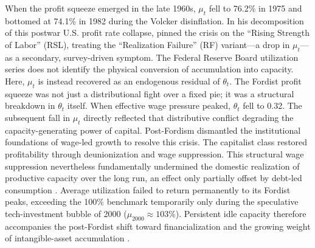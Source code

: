 When the profit squeeze emerged in the late 1960s, $\mu_t$ fell to 76.2\% in 1975 and bottomed at 74.1\% in 1982 during the Volcker disinflation. In his decomposition of this postwar U.S. profit rate collapse, \citet{Weisskopf1979} pinned the crisis on the ``Rising Strength of Labor'' (RSL), treating the ``Realization Failure'' (RF) variant—a drop in $\mu_t$—as a secondary, survey-driven symptom. The Federal Reserve Board utilization series does not identify the physical conversion of accumulation into capacity. Here, $\mu_t$ is instead recovered as an endogenous residual of $\theta_t$. The Fordist profit squeeze was not just a distributional fight over a fixed pie; it was a structural breakdown in $\theta_t$ itself. When effective wage pressure peaked, $\theta_t$ fell to 0.32. The subsequent fall in $\mu_t$ directly reflected that distributive conflict degrading the capacity-generating power of capital. Post-Fordism dismantled the institutional foundations of wage-led growth to resolve this crisis. The capitalist class restored profitability through deunionization and wage suppression. This structural wage suppression nevertheless fundamentally undermined the domestic realization of productive capacity over the long run, an effect only partially offset by debt-led consumption \citep{Stockhammer2012,Vidal2019}. Average utilization failed to return permanently to its Fordist peaks, exceeding the 100\% benchmark temporarily only during the speculative tech-investment bubble of 2000 ($\mu_{2000} \approx 103\%$). Persistent idle capacity therefore accompanies the post-Fordist shift toward financialization and the growing weight of intangible-asset accumulation \citep{Rikap2021, Rotta2018}.

